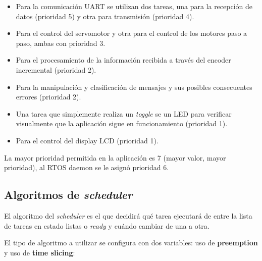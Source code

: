 \documentclass{IEEEtran}
\begin{document}
\begin{itemize}
    \item Para la comunicación UART se utilizan dos tareas, una para la recepción de datos (prioridad 5) y otra para transmisión (prioridad 4).
    \item Para el control del servomotor y otra para el control de los motores paso a paso, ambas con prioridad 3.
    \item Para el procesamiento de la información recibida a través del encoder incremental (prioridad 2).
    \item Para la manipulación y clasificación de mensajes y sus posibles consecuentes errores (prioridad 2).
    \item Una tarea que simplemente realiza un \textit{toggle} se un LED para verificar visualmente que la aplicación sigue en funcionamiento (prioridad 1).
    \item Para el control del display LCD (prioridad 1). 
\end{itemize}

La mayor prioridad permitida en la aplicación es 7 (mayor valor, mayor prioridad), al RTOS daemon se le asignó prioridad 6.

\subsection{Algoritmos de \textit{scheduler}}
El algoritmo del \textit{scheduler} es el que decidirá qué tarea ejecutará de entre la lista de tareas en estado listas o \textit{ready} y cuándo cambiar de una a otra.

El tipo de algoritmo a utilizar se configura con dos variables: uso de \textbf{preemption} y uso de \textbf{time slicing}:
\end{document}
